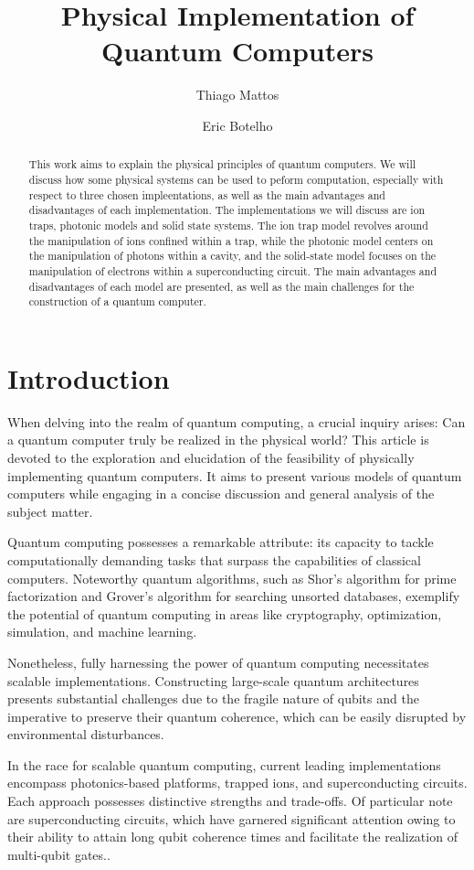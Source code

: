\documentclass[
  journal=largetwo,
  year=2023,
]{cup-journal}
\title{Physical Implementation of Quantum Computers}
\author{Thiago Mattos}
\affiliation{Universidade Federal de Minas Gerais, Departamento de Física, Belo Horizonte, 31270-901, Minas Gerais, Brazil}
\author{Eric Botelho}
\affiliation{Universidade Federal de Minas Gerais, Departamento de Física, Belo Horizonte, 31270-901, Minas Gerais, Brazil}
\begin{document}
\begin{abstract}
  This work aims to explain the physical principles of quantum computers. We will discuss how some physical systems can be used to peform computation, especially with respect to three chosen impleentations, as well as the main advantages and disadvantages of each implementation.
  The implementations we will discuss are ion traps, photonic models and solid state systems. The ion trap model revolves around the manipulation of ions confined within a trap, while the photonic model centers on the manipulation of photons within a cavity, and the solid-state model focuses on the manipulation of electrons within a superconducting circuit.
  The main advantages and disadvantages of each model are presented, as well as the main challenges for the construction of a quantum computer.

\end{abstract}

\section{Introduction}

When delving into the realm of quantum computing, a crucial inquiry arises: Can a quantum computer truly be realized in the physical world? This article is devoted to the exploration and elucidation of the feasibility of physically implementing quantum computers. It aims to present various models of quantum computers while engaging in a concise discussion and general analysis of the subject matter.

Quantum computing possesses a remarkable attribute: its capacity to tackle computationally demanding tasks that surpass the capabilities of classical computers. Noteworthy quantum algorithms, such as Shor's algorithm for prime factorization and Grover's algorithm for searching unsorted databases, exemplify the potential of quantum computing in areas like cryptography, optimization, simulation, and machine learning.

Nonetheless, fully harnessing the power of quantum computing necessitates scalable implementations. Constructing large-scale quantum architectures presents substantial challenges due to the fragile nature of qubits and the imperative to preserve their quantum coherence, which can be easily disrupted by environmental disturbances.

In the race for scalable quantum computing, current leading implementations encompass photonics-based platforms, trapped ions, and superconducting circuits. Each approach possesses distinctive strengths and trade-offs. Of particular note are superconducting circuits, which have garnered significant attention owing to their ability to attain long qubit coherence times and facilitate the realization of multi-qubit gates.\autocite{arute_2019_quantum}.
\end{document}
